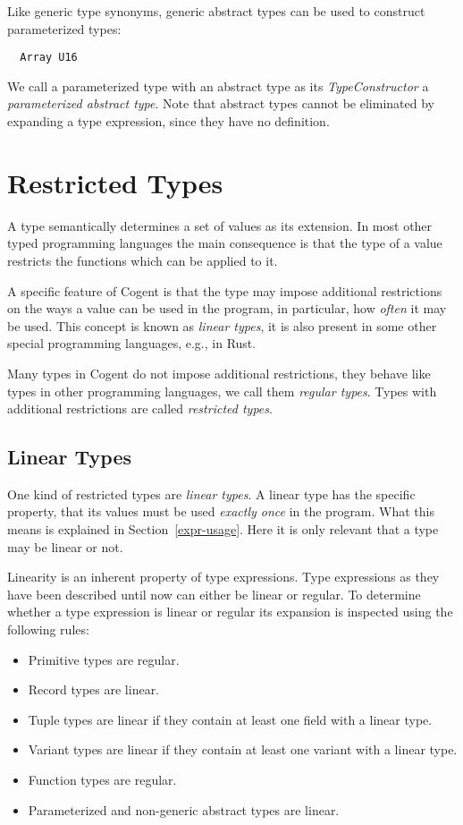 \documentclass[a4paper]{report}
\newcommand{\cogent}{Cogent\xspace}
\begin{document}
Like generic type synonyms, generic abstract types can be used to construct parameterized types:

\begin{verbatim}
  Array U16
\end{verbatim}

We call a parameterized type with an abstract type as its \textit{TypeConstructor} a \textit{parameterized abstract type}.
Note that abstract types cannot be eliminated by expanding a type expression, since they have no definition.

\section{Restricted Types}

A type semantically determines a set of values as its extension. In most other typed programming languages the main
consequence is that the type of a value restricts the functions which can be applied to it. 

A specific feature of \cogent is that the type may impose additional restrictions on the ways a value can be used 
in the program, in particular, how \textit{often} it may be used. This concept is known as \textit{linear types},
it is also present in some other special programming languages, e.g., in Rust.

Many types in \cogent do not impose additional restrictions, they behave like types in other programming languages,
we call them \textit{regular types}. Types with additional restrictions are called \textit{restricted types}.

\subsection{Linear Types}

One kind of restricted types are \textit{linear types}. A linear type has the specific property, that its values must 
be used \textit{exactly once} in the program. What this means is explained in Section~\ref{expr-usage}. Here it is 
only relevant that a type may be linear or not.

Linearity is an inherent property of type expressions. Type expressions as they have been described until now can either
be linear or regular. To determine whether a type expression is linear or regular 
its expansion is inspected using the following rules:
\begin{itemize}
\item Primitive types are regular.
\item Record types are linear.
\item Tuple types are linear if they contain at least one field with a linear type.
\item Variant types are linear if they contain at least one variant with a linear type.
\item Function types are regular.
\item Parameterized and non-generic abstract types are linear.
\end{itemize}
\end{document}
